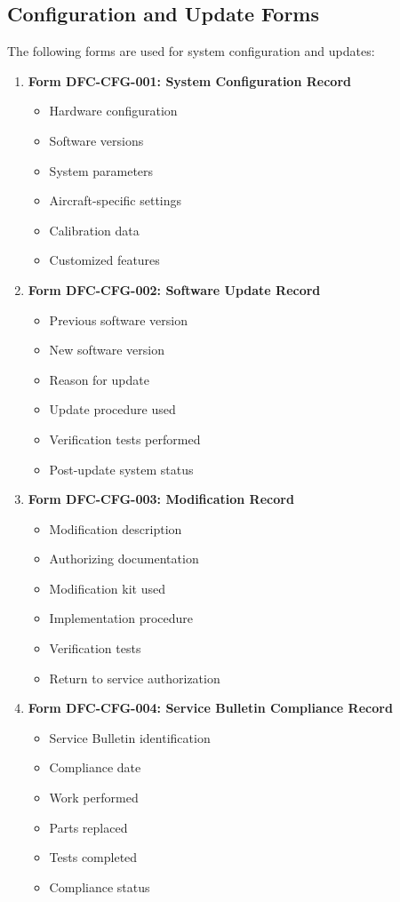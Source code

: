 \documentclass[12pt,a4paper,twoside,openright]{book}
\begin{document}
\subsection{Configuration and Update Forms}

The following forms are used for system configuration and updates:

\begin{enumerate}
    \item \textbf{Form DFC-CFG-001: System Configuration Record}
    \begin{itemize}
        \item Hardware configuration
        \item Software versions
        \item System parameters
        \item Aircraft-specific settings
        \item Calibration data
        \item Customized features
    \end{itemize}
    
    \item \textbf{Form DFC-CFG-002: Software Update Record}
    \begin{itemize}
        \item Previous software version
        \item New software version
        \item Reason for update
        \item Update procedure used
        \item Verification tests performed
        \item Post-update system status
    \end{itemize}
    
    \item \textbf{Form DFC-CFG-003: Modification Record}
    \begin{itemize}
        \item Modification description
        \item Authorizing documentation
        \item Modification kit used
        \item Implementation procedure
        \item Verification tests
        \item Return to service authorization
    \end{itemize}
    
    \item \textbf{Form DFC-CFG-004: Service Bulletin Compliance Record}
    \begin{itemize}
        \item Service Bulletin identification
        \item Compliance date
        \item Work performed
        \item Parts replaced
        \item Tests completed
        \item Compliance status
    \end{itemize}
\end{enumerate}
\end{document}
